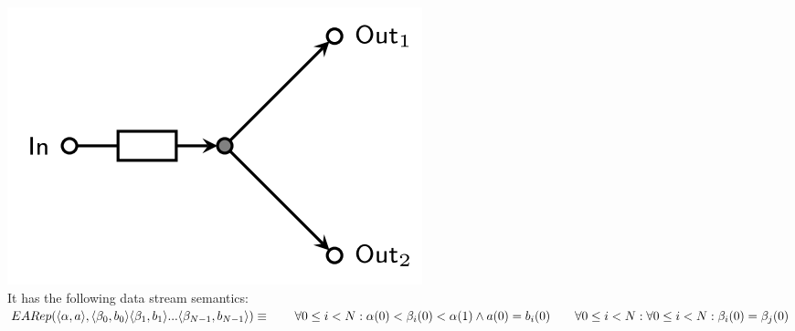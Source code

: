 \includegraphics[]{img/EARep.png}\\
%
It has the following data stream semantics:\\
%
$
EARep(\langle \alpha, a \rangle, \langle \beta_0, b_0 \rangle \langle \beta_1, b_1 \rangle... \langle \beta_{N-1}, b_{N-1} \rangle) \equiv \\
\hphantom \qquad \forall 0 \leq i < N : \alpha(0) < \beta_i(0) < \alpha(1) \land a(0) = b_i(0) \\
\hphantom \qquad\forall 0 \leq i < N : \forall 0 \leq i < N : \beta_i(0) = \beta_j(0)
$\\
